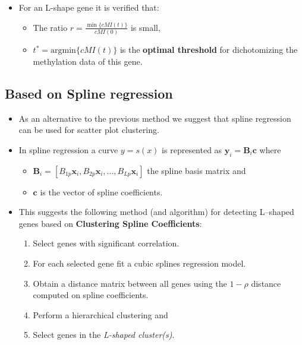 \begin{itemize}
\item For an L-shape gene it is verified that:
\begin{itemize}
\item The ratio $r=\frac{\min\{\mathit{cMI}(t)\}}{\mathit{cMI}(0)}$ is small, 
\item $t^{\ast} = \mathrm{argmin}\{ \mathit{cMI}(t) \}$ is the \textbf{optimal threshold} for 
dichotomizing the methylation data of this gene.
\end{itemize}
\end{itemize}

  

\subsection{Based on Spline regression}
\begin{itemize}
\item As an alternative to the previous method we suggest that spline regression \cite{racine} can be used for scatter plot clustering.
\item In spline regression a curve $y=s(x)$ is represented as $\mathbf{y}_i=\mathbf{B}_i\mathbf{c}$ where 
\begin{itemize}
\item $\mathbf{B}_i =\left[ B_{1p}\mathbf{x}_i,B_{2p}\mathbf{x}_i,\dots,B_{Lp}\mathbf{x}_i \right]$ the spline basis matrix and 
\item $\mathbf{c}$ is the vector of spline coefficients.
\end{itemize}

\item This suggests the following method (and algorithm) for detecting L--shaped genes based on \textbf{Clustering Spline Coefficients}:
\begin {enumerate}
\item Select genes with significant correlation.
\item For each selected gene fit a cubic splines regression model.
\item Obtain a distance matrix between all genes using the $1-\rho$ distance computed on spline coefficients.
\item Perform a hierarchical clustering and 
\item Select genes in the \textit{L-shaped cluster(s)}.
\end{enumerate}
\end{itemize}
